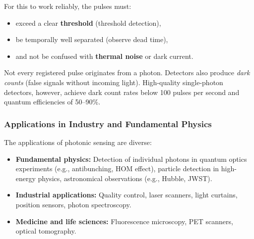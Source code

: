 For this to work reliably, the pulses must:
\begin{itemize}
	\item exceed a clear \textbf{threshold} (threshold detection),
	\item be temporally well separated (observe dead time),
	\item and not be confused with \textbf{thermal noise} or dark current.
\end{itemize}
\vspace{1em}
\begin{tcolorbox}[didaktikbox, title=What Counts as a Photon? ]
	\label{box:photonenzaehlung}
	\small
	Not every registered pulse originates from a photon. Detectors also produce \emph{dark counts} (false signals without incoming light). High-quality single-photon detectors, however, achieve dark count rates below 100 pulses per second and quantum efficiencies of 50–90\%.
\end{tcolorbox}

\subsubsection{Applications in Industry and Fundamental Physics}

The applications of photonic sensing are diverse:

\begin{itemize}
	\item \textbf{Fundamental physics:} Detection of individual photons in quantum optics experiments (e.g., antibunching, HOM effect), particle detection in high-energy physics, astronomical observations (e.g., Hubble, JWST).
	\item \textbf{Industrial applications:} Quality control, laser scanners, light curtains, position sensors, photon spectroscopy.
	\item \textbf{Medicine and life sciences:} Fluorescence microscopy, PET scanners, optical tomography.
\end{itemize}

